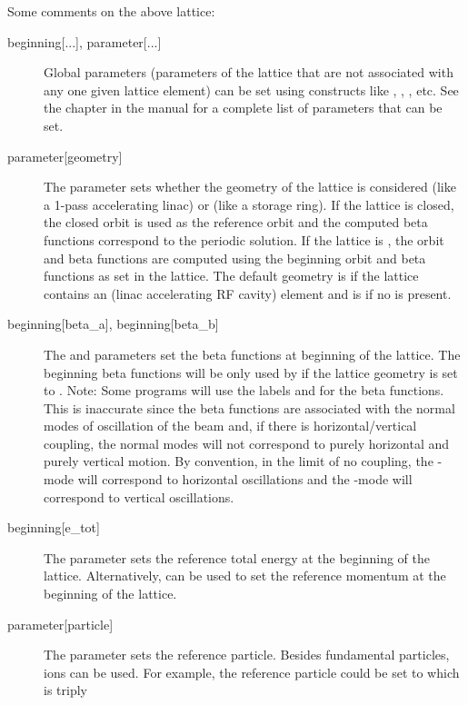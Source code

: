 \documentclass{hitec}     %
\begin{document}
Some comments on the above lattice:
  \begin{description}
  \item[{beginning[...], parameter[...]}] \Newline
Global parameters (parameters of the lattice that are not associated with any one given lattice
element) can be set using constructs like , ,
, etc. See the  chapter in the \bmad
manual for a complete list of parameters that can be set.
  \item[{parameter[geometry]}] \Newline
The  parameter sets whether the geometry of the lattice is considered
 (like a 1-pass accelerating linac) or  (like a storage ring). If the lattice is
closed, the closed orbit is used as the reference orbit and the computed beta functions correspond
to the periodic solution. If the lattice is , the orbit and beta functions are computed
using the beginning orbit and beta functions as set in the lattice. The default geometry is
 if the lattice contains an  (linac accelerating RF cavity) element and is
 if no  is present.
  \item[{beginning[beta_a], beginning[beta_b]}] \Newline
The  and  parameters set the beta functions at beginning
of the lattice. The beginning beta functions will be only used by \bmad if the lattice geometry is
set to . Note: Some programs will use the labels  and  for the beta
functions. This is inaccurate since the beta functions are associated with the normal modes of
oscillation of the beam and, if there is horizontal/vertical coupling, the normal modes will not
correspond to purely horizontal and purely vertical motion. By convention, in the limit of no
coupling, the -mode will correspond to horizontal oscillations and the -mode will
correspond to vertical oscillations.
  \item[{beginning[e_tot]}] \Newline
The  parameter sets the reference total energy at the beginning of the lattice.
Alternatively,  can be used to set the reference momentum at the beginning of the
lattice.
  \item[{parameter[particle]}] \Newline
The  parameter sets the reference particle. Besides fundamental particles,
ions can be used. For example, the reference particle could be set to  which is triply

\end{description}
\end{document}
